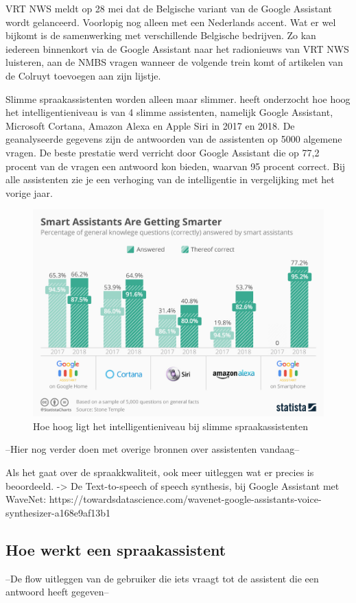 VRT NWS meldt op 28 mei dat de Belgische variant van de Google Assistant wordt gelanceerd. \autocite{Belghmidi2019} Voorlopig nog alleen met een Nederlands accent. Wat er wel bijkomt is de samenwerking met verschillende Belgische bedrijven. Zo kan iedereen binnenkort via de Google Assistant naar het radionieuws van VRT NWS luisteren, aan de NMBS vragen wanneer de volgende trein komt of artikelen van de Colruyt toevoegen aan zijn lijstje.

Slimme spraakassistenten worden alleen maar slimmer. \autocite{Brandt2018} heeft onderzocht hoe hoog het intelligentieniveau is van 4 slimme assistenten, namelijk Google Assistant, Microsoft Cortana, Amazon Alexa en Apple Siri in 2017 en 2018. De geanalyseerde gegevens zijn de antwoorden van de assistenten op 5000 algemene vragen. De beste prestatie werd verricht door Google Assistant die op 77,2 procent van de vragen een antwoord kon bieden, waarvan 95 procent correct. Bij alle assistenten zie je een verhoging van de intelligentie in vergelijking met het vorige jaar.

\begin{figure}[h]
    \includegraphics[width=0.7\linewidth]{img/SmartAssistantsAreGettingSmarter}
    \caption{Hoe hoog ligt het intelligentieniveau bij slimme spraakassistenten \autocite{Brandt2018}}
    \label{fig:smartassistantsaregettingsmarter}
\end{figure}

--Hier nog verder doen met overige bronnen over assistenten vandaag--

Als het gaat over de spraakkwaliteit, ook meer uitleggen wat er precies is beoordeeld.
-> De Text-to-speech of speech synthesis, bij Google Assistant met WaveNet: https://towardsdatascience.com/wavenet-google-assistants-voice-synthesizer-a168e9af13b1

\subsection{Hoe werkt een spraakassistent}
--De flow uitleggen van de gebruiker die iets vraagt tot de assistent die een antwoord heeft gegeven--

